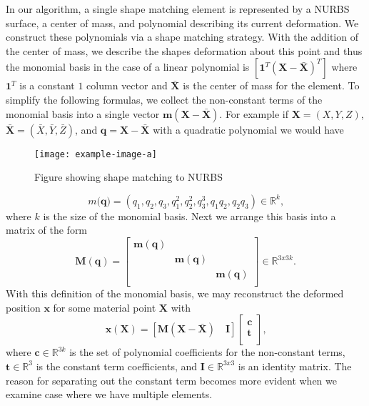 In our algorithm, a single shape matching element is represented by a NURBS surface, a center of mass, and polynomial describing its current deformation. We construct these polynomials via a shape matching strategy. With the addition of the center of mass, we describe the shapes deformation about this point and thus the monomial basis in the case of a linear polynomial is $\left[ \mathbf 1^T (\mathbf{X - \bar{X}})^T \right]$ where $\mathbf 1^T$ is a constant $1$ column vector and $\mathbf{\bar{X}}$ is the center of mass for the element. To simplify the following formulas, we collect the non-constant terms of the monomial basis into a single vector $\mathbf{m}(\mathbf{X}-\mathbf{\bar{X}})$. For example if $\mathbf{X} = (X,Y,Z)$, $\mathbf{\bar{X}} = (\bar X, \bar Y, \bar Z)$, and $\mathbf{q}=\mathbf{X}-\mathbf{\bar{X}}$ with a quadratic polynomial we would have

\begin{figure}
    \texttt{[image: example-image-a]}
    \caption{Figure showing shape matching to NURBS}
    \label{fig:shapematching}
\end{figure}

\begin{equation}
m(\mathbf{q)} = (
					q_1, q_2, q_3,
                   	q_1^2, q_2^2, q_3^3,
                   	q_1 q_2, q_2 q_3
                ) \in \mathbb{R}^k
                \text{,}
\end{equation}
where $k$ is the size of the monomial basis. Next we arrange this basis into a matrix of the form
\begin{equation}
\mathbf{M}(\mathbf{q}) = \left[ \begin{array}{ccc}
\mathbf{m}(\mathbf{q}) &  &  \\
 & \mathbf{m}(\mathbf{q})  &  \\
 &  & \mathbf{m}(\mathbf{q})  \\
\end{array} \right] \in \mathbb{R}^{3x3k}
\text{.}
\end{equation}
With this definition of the monomial basis, we may reconstruct the deformed position $\mathbf{x}$ for some material point $\mathbf{X}$ with
\begin{equation}
\mathbf{x}(\mathbf{X}) = \left[\mathbf{M}(\mathbf{X-\bar{X}}) \quad \mathbf{I} \right]
\left[ \begin{array}{c}
\mathbf{c} \\
\mathbf{t} \\
\end{array} \right]
\text{,}
\end{equation}
where $\mathbf{c} \in \mathbb{R}^{3k}$ is the set of polynomial coefficients for the non-constant terms, $\mathbf{t} \in \mathbb{R}^3$ is the constant term coefficients, and $\mathbf{I} \in \mathbb{R}^{3x3}$ is an identity matrix. The reason for separating out the constant term becomes more evident when we examine case where we have multiple elements.


